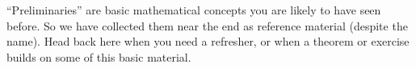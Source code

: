 \begin{para}``Preliminaries'' are basic mathematical concepts you are likely to have seen before.  So we have collected them near the end as reference material (despite the name).  Head back here when you need a refresher, or when a theorem or exercise builds on some of this basic material.\end{para}